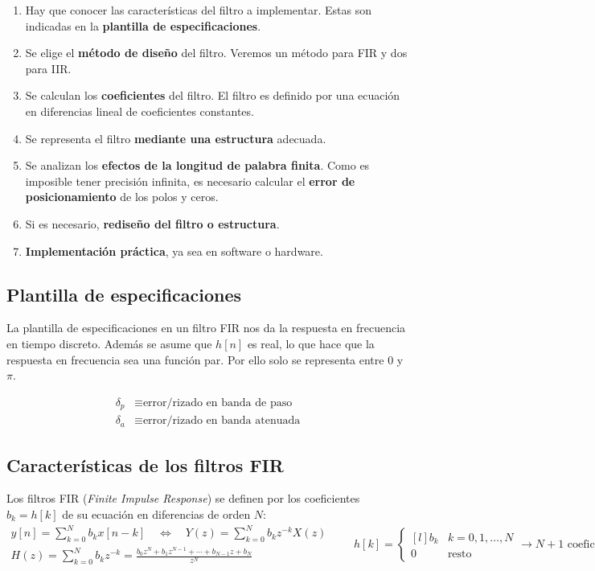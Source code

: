\documentclass[a4paper,oneside]{book}
\begin{document}
\begin{enumerate}
	 \item Hay que conocer las características del filtro a implementar. Estas son indicadas en la \textbf{plantilla de especificaciones}.
	 \item Se elige el \textbf{método de diseño} del filtro. Veremos un método para FIR y dos para IIR.
	 \item Se calculan los \textbf{coeficientes} del filtro. El filtro es definido por una ecuación en diferencias lineal de coeficientes constantes.
	 \item Se representa el filtro \textbf{mediante una estructura} adecuada.
	 \item Se analizan los \textbf{efectos de la longitud de palabra finita}. Como es imposible tener precisión infinita, es necesario calcular el \textbf{error de posicionamiento} de los polos y ceros.
	 \item Si es necesario, \textbf{rediseño del filtro o estructura}.
	 \item \textbf{Implementación práctica}, ya sea en software o hardware.
\end{enumerate}



\subsection{Plantilla de especificaciones}

La plantilla de especificaciones en un filtro FIR nos da la respuesta en frecuencia en tiempo discreto. Además se asume que $h[n]$ es real, lo que hace que la respuesta en frecuencia sea una función par. Por ello solo se representa entre $0$ y $\pi$.

\begin{align*}
	\delta_p &\equiv \text{error/rizado en banda de paso}\\ 
	\delta_a &\equiv \text{error/rizado en banda atenuada}\
\end{align*}

\subsection{Características de los filtros FIR}

Los filtros FIR (\textit{Finite Impulse Response}) se definen por los coeficientes $b_k = h[k]$ de su ecuación en diferencias de orden $N$:
\[ \begin{matrix}
	\displaystyle{y[n] = \sum_{k=0}^{N}b_kx[n-k] \quad \Longleftrightarrow \quad Y(z) = \sum_{k=0}^{N}b_kz^{-k}X(z)}\\
	\displaystyle{H(z) = \sum_{k=0}^{N}b_kz^{-k} = \frac{b_0z^N + b_1z^{N-1} + \cdots + b_{N-1}z + b_N}{z^N}}
\end{matrix} \qquad h[k] = \left\lbrace 
\begin{matrix*}[l]
	b_k & k = 0, 1, \ldots, N\\
	0 & \text{resto}
\end{matrix*} \right. \rightarrow N+1 \text{ coeficientes}\]
\end{document}
